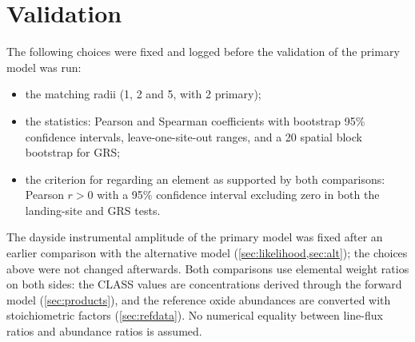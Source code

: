 \section{Validation}\label{sec:validation}

The following choices were fixed and logged before the validation of the primary model was run:
\begin{itemize}
\item the matching radii (1, 2 and 5\textdegree, with 2\textdegree{} primary);
\item the statistics: Pearson and Spearman coefficients with bootstrap 95\% confidence intervals, leave-one-site-out ranges, and a 20\textdegree{} spatial block bootstrap for GRS;
\item the criterion for regarding an element as supported by both comparisons: Pearson $r>0$ with a 95\% confidence interval excluding zero in both the landing-site and GRS tests.
\end{itemize}
The dayside instrumental amplitude of the primary model was fixed after an earlier comparison with the alternative model (\cref{sec:likelihood,sec:alt}); the choices above were not changed afterwards. Both comparisons use elemental weight ratios on both sides: the CLASS values are concentrations derived through the forward model (\cref{sec:products}), and the reference oxide abundances are converted with stoichiometric factors (\cref{sec:refdata}). No numerical equality between line-flux ratios and abundance ratios is assumed.

